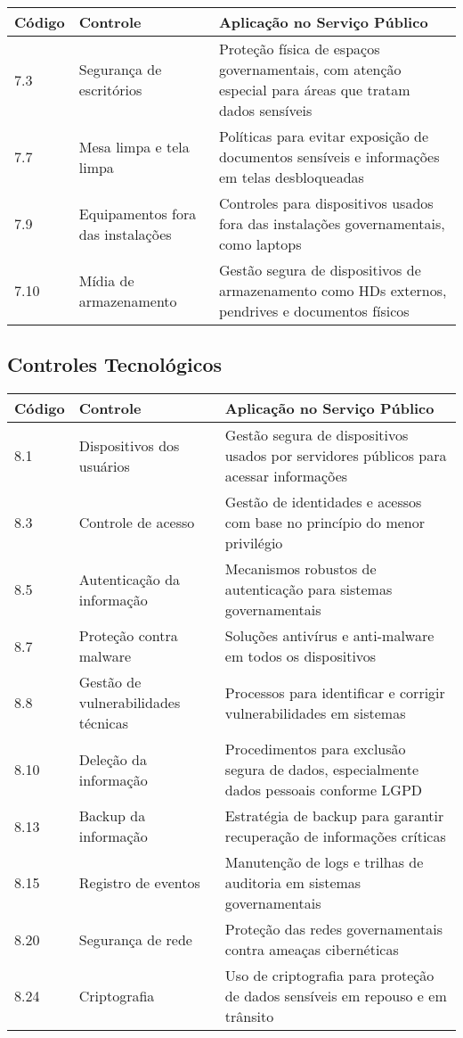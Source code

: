 \documentclass[12pt,a4paper]{report}
\begin{document}
\begin{longtable}{p{2cm}p{4cm}p{9cm}}
\toprule
\textbf{Código} & \textbf{Controle} & \textbf{Aplicação no Serviço Público} \\
\midrule
7.3 & Segurança de escritórios & Proteção física de espaços governamentais, com atenção especial para áreas que tratam dados sensíveis \\
\midrule
7.7 & Mesa limpa e tela limpa & Políticas para evitar exposição de documentos sensíveis e informações em telas desbloqueadas \\
\midrule
7.9 & Equipamentos fora das instalações & Controles para dispositivos usados fora das instalações governamentais, como laptops \\
\midrule
7.10 & Mídia de armazenamento & Gestão segura de dispositivos de armazenamento como HDs externos, pendrives e documentos físicos \\
\bottomrule
\end{longtable}

\subsection{Controles Tecnológicos}

\begin{longtable}{p{2cm}p{4cm}p{9cm}}
\toprule
\textbf{Código} & \textbf{Controle} & \textbf{Aplicação no Serviço Público} \\
\midrule
8.1 & Dispositivos dos usuários & Gestão segura de dispositivos usados por servidores públicos para acessar informações \\
\midrule
8.3 & Controle de acesso & Gestão de identidades e acessos com base no princípio do menor privilégio \\
\midrule
8.5 & Autenticação da informação & Mecanismos robustos de autenticação para sistemas governamentais \\
\midrule
8.7 & Proteção contra malware & Soluções antivírus e anti-malware em todos os dispositivos \\
\midrule
8.8 & Gestão de vulnerabilidades técnicas & Processos para identificar e corrigir vulnerabilidades em sistemas \\
\midrule
8.10 & Deleção da informação & Procedimentos para exclusão segura de dados, especialmente dados pessoais conforme LGPD \\
\midrule
8.13 & Backup da informação & Estratégia de backup para garantir recuperação de informações críticas \\
\midrule
8.15 & Registro de eventos & Manutenção de logs e trilhas de auditoria em sistemas governamentais \\
\midrule
8.20 & Segurança de rede & Proteção das redes governamentais contra ameaças cibernéticas \\
\midrule
8.24 & Criptografia & Uso de criptografia para proteção de dados sensíveis em repouso e em trânsito \\
\bottomrule
\end{longtable}
\end{document}
